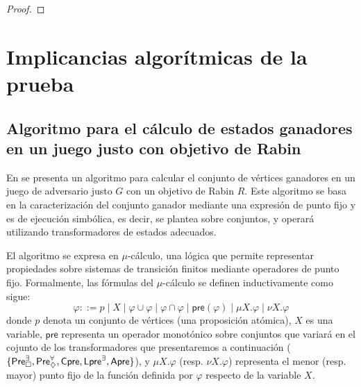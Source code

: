 \begin{proof}


\end{proof}

\section{Implicancias algorítmicas de la prueba}

\subsection*{Algoritmo para el cálculo de estados ganadores en un juego justo con objetivo de Rabin}


En \cite{Banerjee} se presenta un algoritmo para calcular el conjunto de
vértices ganadores en un juego de adversario justo \( G \) con un objetivo de
Rabin \( R \). Este algoritmo se basa en la caracterización del conjunto
ganador mediante una expresión de punto fijo y es de ejecución simbólica, es
decir, se plantea sobre conjuntos, y operará utilizando transformadores de
estados adecuados.

El algoritmo se expresa en $\mu$-cálculo, una lógica que permite representar
propiedades sobre sistemas de transición finitos mediante operadores de punto
fijo. Formalmente, las fórmulas del $\mu$-cálculo se definen inductivamente
como sigue:
\[
	\varphi ::= p \mid X \mid \varphi \cup \varphi \mid \varphi \cap \varphi \mid \textsf{pre}(\varphi) \mid \mu X.\varphi \mid \nu X.\varphi
\]
donde \( p \) denota un conjunto de vértices (una proposición atómica), \( X \)
es una variable, \(\textsf{pre}\) representa un operador monotónico sobre
conjuntos que variará en el cojunto de los transformadores que presentaremos a
continuación ($\{\textsf{Pre}_\square^\exists, \textsf{Pre}_\diamondsuit^\forall, \textsf{Cpre}, \textsf{Lpre}^\exists,
	\textsf{Apre}\}$), y \( \mu X.\varphi \) (resp. \( \nu X.\varphi \)) representa el
menor (resp. mayor) punto fijo de la función definida por \( \varphi \)
respecto de la variable \( X \).

